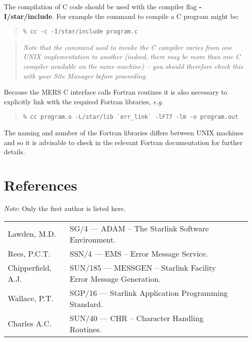 \documentclass[twoside,11pt]{article}
\newcommand{\xref}[3]{#1}
\newcommand{\xlabel}[1]{}
\renewcommand{\_}{\texttt{\symbol{95}}}
\begin{document}
The compilation of C code should be used with the compiler flag
\textbf{-I/star/include}. 
For example the command to compile a C program might be:
\begin {quote}
\begin{verbatim}
% cc -c -I/star/include program.c
\end{verbatim}
\end {quote}

\begin {quote}
\emph{Note that the command used to invoke the C compiler varies from 
one UNIX implementation to another (indeed, there may be more than one C
compiler available on the same machine) -- you should therefore check this
with your Site Manager before proceeding.}
\end {quote}
Because the MERS C interface calls Fortran routines it is also necessary to
explicitly link with the required Fortran libraries, \textit{e.g.}
\begin {quote}
\begin{verbatim}
% cc program.o -L/star/lib `err_link` -lF77 -lm -o program.out
\end{verbatim}
\end {quote}
The naming and number of the Fortran libraries differs between UNIX machines 
and so it is advisable to check in the relevant Fortran documentation for 
further details.

\section{\xlabel{references}References}
\emph{Note}: Only the first author is listed here.

\begin {tabular}{lll}
Lawden, M.D. & \xref{SG/4}{sg4}{} 
--- ADAM -- The Starlink Software Environment.\\
Rees, P.C.T. & \xref{SSN/4}{ssn4}{} 
--- EMS -- Error Message Service.\\
Chipperfield, A.J. & \xref{SUN/185}{sun185}{} 
--- MESSGEN -- Starlink Facility Error Message Generation.\\
Wallace, P.T. & \xref{SGP/16}{sgp16}{}
--- Starlink Application Programming Standard.\\
Charles A.C. & \xref{SUN/40}{sun40}{}
--- CHR -- Character Handling Routines.
\end {tabular}

\end{document}
